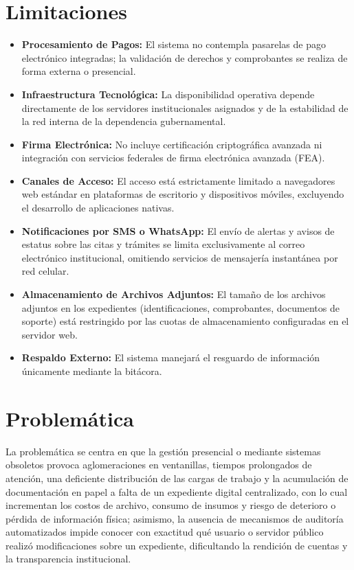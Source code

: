 \section{Limitaciones}

\begin{itemize}
    \item \textbf{Procesamiento de Pagos:} El sistema no contempla pasarelas de pago electrónico integradas; la validación de derechos y comprobantes se realiza de forma externa o presencial.
    \item \textbf{Infraestructura Tecnológica:} La disponibilidad operativa depende directamente de los servidores institucionales asignados y de la estabilidad de la red interna de la dependencia gubernamental.
    \item \textbf{Firma Electrónica:} No incluye certificación criptográfica avanzada ni integración con servicios federales de firma electrónica avanzada (FEA).
    \item \textbf{Canales de Acceso:} El acceso está estrictamente limitado a navegadores web estándar en plataformas de escritorio y dispositivos móviles, excluyendo el desarrollo de aplicaciones nativas.
    \item \textbf{Notificaciones por SMS o WhatsApp:} El envío de alertas y avisos de estatus sobre las citas y trámites se limita exclusivamente al correo electrónico institucional, omitiendo servicios de mensajería instantánea por red celular.
    \item \textbf{Almacenamiento de Archivos Adjuntos:} El tamaño de los archivos adjuntos en los expedientes (identificaciones, comprobantes, documentos de soporte) está restringido por las cuotas de almacenamiento configuradas en el servidor web.
    \item \textbf{Respaldo Externo:} El sistema manejará el resguardo de información únicamente mediante la bitácora.
\end{itemize}

\section{Problemática}

La problemática se centra en que la gestión presencial o mediante sistemas obsoletos provoca aglomeraciones en ventanillas, tiempos prolongados de atención, una deficiente distribución de las cargas de trabajo y la acumulación de documentación en papel a falta de un expediente digital centralizado, con lo cual incrementan los costos de archivo, consumo de insumos y riesgo de deterioro o pérdida de información física; asimismo, la ausencia de mecanismos de auditoría automatizados impide conocer con exactitud qué usuario o servidor público realizó modificaciones sobre un expediente, dificultando la rendición de cuentas y la transparencia institucional.


